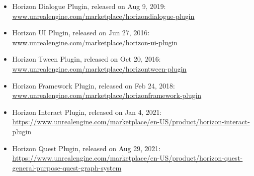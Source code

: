 \documentclass[a4paper,12pt]{memoir} %
\begin{document}
{
  \begin{itemize}
    \item Horizon Dialogue Plugin, released on Aug 9, 2019: \\
        \href{https://www.unrealengine.com/marketplace/horizondialogue-plugin}
             {www.unrealengine.com/marketplace/horizondialogue-plugin} \\
    \item Horizon UI Plugin, released on Jun 27, 2016: \\
        \href{https://www.unrealengine.com/marketplace/horizon-ui-plugin}
             {www.unrealengine.com/marketplace/horizon-ui-plugin} \\
    \item Horizon Tween Plugin, released on Oct 20, 2016: \\
        \href{https://www.unrealengine.com/marketplace/horizontween-plugin}
             {www.unrealengine.com/marketplace/horizontween-plugin} \\
    \item Horizon Framework Plugin, released on Feb 24, 2018: \\
          \href{https://www.unrealengine.com/marketplace/horizonframework-plugin}
               {www.unrealengine.com/marketplace/horizonframework-plugin} \\
    \item Horizon Interact Plugin, released on Jan 4, 2021: \\
          \href{https://www.unrealengine.com/marketplace/en-US/product/horizon-interact-plugin}
              {https://www.unrealengine.com/marketplace/en-US/product/horizon-interact-plugin}  \\
    \item Horizon Quest Plugin, released on Aug 29, 2021: \\
              \href{https://www.unrealengine.com/marketplace/en-US/product/horizon-quest-general-purpose-quest-graph-system}
                  {https://www.unrealengine.com/marketplace/en-US/product/horizon-quest-general-purpose-quest-graph-system}  \\
              

\end{itemize}}
\end{document}
